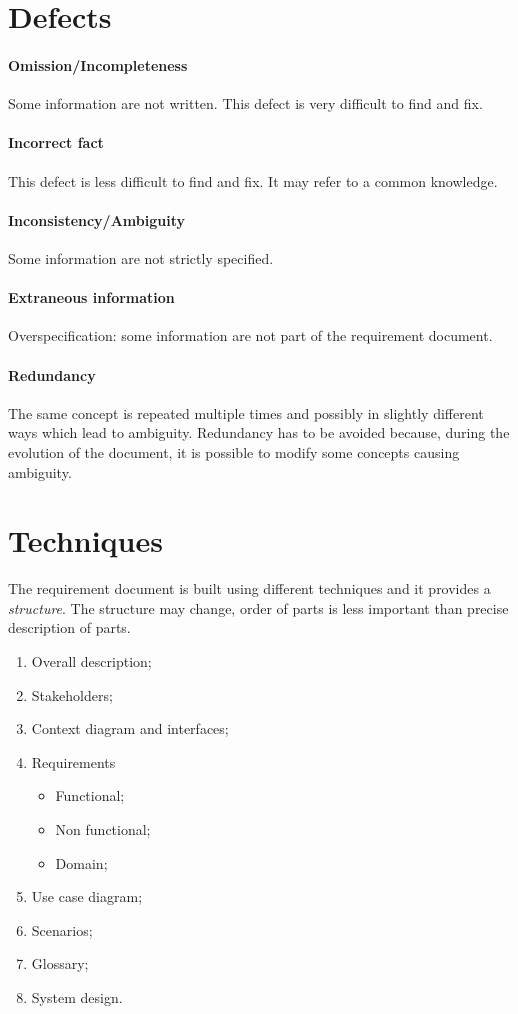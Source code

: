 \section{Defects}
\paragraph{Omission/Incompleteness}
Some information are not written. This defect is very difficult to find and fix.

\paragraph{Incorrect fact}
This defect is less difficult to find and fix. It may refer to a common knowledge.

\paragraph{Inconsistency/Ambiguity}
Some information are not strictly specified.

\paragraph{Extraneous information}
Overspecification: some information are not part of the requirement document.

\paragraph{Redundancy}
The same concept is repeated multiple times and possibly in slightly different ways which lead to ambiguity. Redundancy has to be avoided because, during the evolution of the document, it is possible to modify some concepts causing ambiguity.

\section{Techniques}
The requirement document is built using different techniques and it provides a \emph{structure}. The structure may change, order of parts is less important than precise description of parts.
\begin{enumerate}
\item Overall description;
\item Stakeholders;
\item Context diagram and interfaces;
\item Requirements
\begin{itemize}
\item Functional;
\item Non functional;
\item Domain;
\end{itemize}
\item Use case diagram;
\item Scenarios;
\item Glossary;
\item System design.
\end{enumerate}

